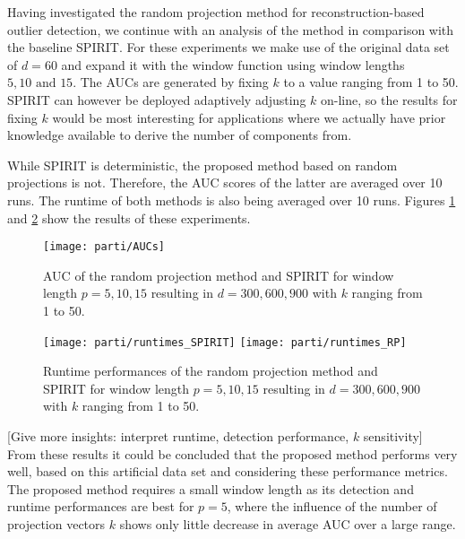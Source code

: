 Having investigated the random projection method for reconstruction-based outlier detection, we continue with an analysis of the method in comparison with the baseline SPIRIT. For these experiments we make use of the original data set of $d=60$ and expand it with the window function using window lengths $5, 10 \text{ and } 15$. The AUCs are generated by fixing $k$ to a value ranging from 1 to 50. SPIRIT can however be deployed adaptively adjusting $k$ on-line, so the results for fixing $k$ would be most interesting for applications where we actually have prior knowledge available to derive the number of components from.

While SPIRIT is deterministic, the proposed method based on random projections is not. Therefore, the AUC scores of the latter are averaged over 10 runs. The runtime of both methods is also being averaged over 10 runs. Figures \ref{fig:parti_AUCs} and \ref{fig:parti_runtimes} show the results of these experiments.

\begin{figure}[h]
	\centering
	\texttt{[image: parti/AUCs]}
	\caption{AUC of the random projection method and SPIRIT for window length $p={5,10,15}$ resulting in $d={300,600,900}$ with $k$ ranging from 1 to 50.}
	\label{fig:parti_AUCs}
\end{figure}

\begin{figure}[h]
	\centering
	\texttt{[image: parti/runtimes\_SPIRIT]}
	\texttt{[image: parti/runtimes\_RP]}
	\caption{Runtime performances of the random projection method and SPIRIT for window length $p={5,10,15}$ resulting in $d={300,600,900}$ with $k$ ranging from 1 to 50.}
	\label{fig:parti_runtimes}
\end{figure}


[Give more insights: interpret runtime, detection performance, $k$ sensitivity]\\

From these results it could be concluded that the proposed method performs very well, based on this artificial data set and considering these performance metrics. The proposed method requires a small window length as its detection and runtime performances are best for $p=5$, where the influence of the number of projection vectors $k$ shows only little decrease in average AUC over a large range. 

